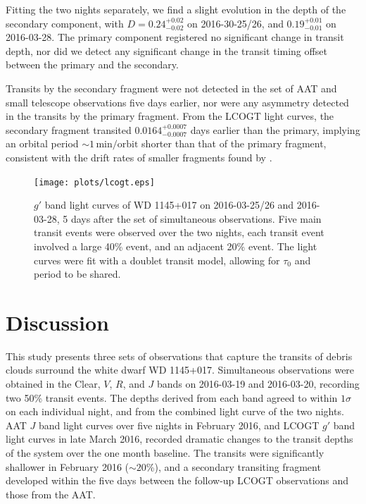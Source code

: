 \documentclass[iop,useAMES,usenatbig]{emulateapj}
\begin{document}
Fitting the two nights separately, we find a slight evolution in the depth of the secondary component, with $D=0.24_{-0.02}^{+0.02}$ on 2016-30-25/26, and $0.19_{-0.01}^{+0.01}$ on 2016-03-28. The primary component registered no significant change in transit depth, nor did we detect any significant change in the transit timing offset between the primary and the secondary.

Transits by the secondary fragment were not detected in the set of AAT and small telescope observations five days earlier, nor were any asymmetry detected in the transits by the primary fragment. From the LCOGT light curves, the secondary fragment transited $0.0164_{-0.0007}^{+0.0007}$ days earlier than the primary, implying an orbital period $\sim 1\,\mathrm{min/orbit}$ shorter than that of the primary fragment, consistent with the drift rates of smaller fragments found by \citet{2016MNRAS.tmp..406R}.   
\begin{figure}
    \centering
    \texttt{[image: plots/lcogt.eps]}
    \caption{$g'$ band light curves of WD 1145+017 on 2016-03-25/26 and 2016-03-28, 5 days after the set of simultaneous observations. Five main transit events were observed over the two nights, each transit event involved a large 40\% event, and an adjacent 20\% event. The light curves were fit with a doublet transit model, allowing for $\tau_0$ and period to be shared.}
    \label{fig:lcogt}
\end{figure}

\section{Discussion}
\label{sec:discussion}

This study presents three sets of observations that capture the transits of debris clouds surround the white dwarf WD 1145+017. Simultaneous observations were obtained in the Clear, $V$, $R$, and $J$ bands on 2016-03-19 and 2016-03-20, recording two 50\% transit events. The depths derived from each band agreed to within $1\sigma$ on each individual night, and from the combined light curve of the two nights. AAT $J$ band light curves over five nights in February 2016, and LCOGT $g'$ band light curves in late March 2016, recorded dramatic changes to the transit depths of the system over the one month baseline. The transits were significantly shallower in February 2016 ($\sim 20$\%), and a secondary transiting fragment developed within the five days between the follow-up LCOGT observations and those from the AAT. 
\end{document}
